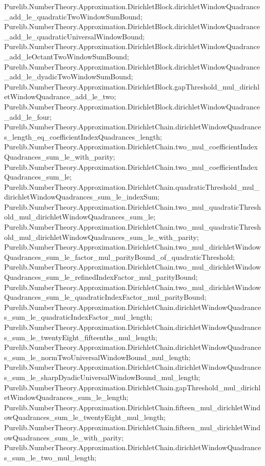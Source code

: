 \documentclass[11pt]{article}
\begin{document}
{Purelib.NumberTheory.Approximation.DirichletBlock.dirichletWindowQuadrance_add_le_quadraticTwoWindowSumBound;
Purelib.NumberTheory.Approximation.DirichletBlock.dirichletWindowQuadrance_add_le_quadraticUniversalWindowBound;
Purelib.NumberTheory.Approximation.DirichletBlock.dirichletWindowQuadrance_add_leOctantTwoWindowSumBound;
Purelib.NumberTheory.Approximation.DirichletBlock.dirichletWindowQuadrance_add_le_dyadicTwoWindowSumBound;
Purelib.NumberTheory.Approximation.DirichletBlock.gapThreshold_mul_dirichletWindowQuadrance_add_le_two;
Purelib.NumberTheory.Approximation.DirichletBlock.dirichletWindowQuadrance_add_le_four;
Purelib.NumberTheory.Approximation.DirichletChain.dirichletWindowQuadrances_length_eq_coefficientIndexQuadrances_length;
Purelib.NumberTheory.Approximation.DirichletChain.two_mul_coefficientIndexQuadrances_sum_le_with_parity;
Purelib.NumberTheory.Approximation.DirichletChain.two_mul_coefficientIndexQuadrances_sum_le;
Purelib.NumberTheory.Approximation.DirichletChain.quadraticThreshold_mul_dirichletWindowQuadrances_sum_le_indexSum;
Purelib.NumberTheory.Approximation.DirichletChain.two_mul_quadraticThreshold_mul_dirichletWindowQuadrances_sum_le;
Purelib.NumberTheory.Approximation.DirichletChain.two_mul_quadraticThreshold_mul_dirichletWindowQuadrances_sum_le_with_parity;
Purelib.NumberTheory.Approximation.DirichletChain.two_mul_dirichletWindowQuadrances_sum_le_factor_mul_parityBound_of_quadraticThreshold;
Purelib.NumberTheory.Approximation.DirichletChain.two_mul_dirichletWindowQuadrances_sum_le_refinedIndexFactor_mul_parityBound;
Purelib.NumberTheory.Approximation.DirichletChain.two_mul_dirichletWindowQuadrances_sum_le_quadraticIndexFactor_mul_parityBound;
Purelib.NumberTheory.Approximation.DirichletChain.dirichletWindowQuadrances_sum_le_quadraticIndexFactor_mul_length;
Purelib.NumberTheory.Approximation.DirichletChain.dirichletWindowQuadrances_sum_le_twentyEight_fifteenths_mul_length;
Purelib.NumberTheory.Approximation.DirichletChain.dirichletWindowQuadrances_sum_le_normTwoUniversalWindowBound_mul_length;
Purelib.NumberTheory.Approximation.DirichletChain.dirichletWindowQuadrances_sum_le_sharpDyadicUniversalWindowBound_mul_length;
Purelib.NumberTheory.Approximation.DirichletChain.gapThreshold_mul_dirichletWindowQuadrances_sum_le_length;
Purelib.NumberTheory.Approximation.DirichletChain.fifteen_mul_dirichletWindowQuadrances_sum_le_twentyEight_mul_length;
Purelib.NumberTheory.Approximation.DirichletChain.fifteen_mul_dirichletWindowQuadrances_sum_le_with_parity;
Purelib.NumberTheory.Approximation.DirichletChain.dirichletWindowQuadrances_sum_le_two_mul_length;
}
\end{document}
